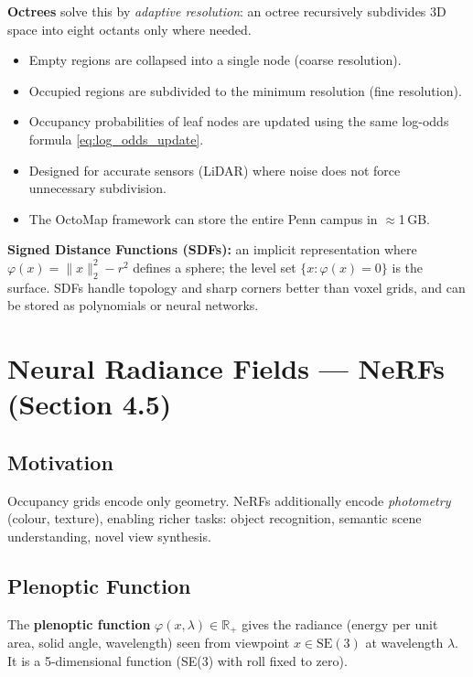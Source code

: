 \documentclass[12pt, a4paper]{article}
\begin{document}
\textbf{Octrees} solve this by \emph{adaptive resolution}: an octree
recursively subdivides 3D space into eight octants only where needed.
\begin{itemize}
  \item Empty regions are collapsed into a single node (coarse
    resolution).
  \item Occupied regions are subdivided to the minimum resolution
    (fine resolution).
  \item Occupancy probabilities of leaf nodes are updated using the
    same log-odds formula \eqref{eq:log_odds_update}.
  \item Designed for accurate sensors (LiDAR) where noise does not
    force unnecessary subdivision.
  \item The OctoMap framework can store the entire Penn campus in
    $\approx$1\,GB.
\end{itemize}

\textbf{Signed Distance Functions (SDFs):} an implicit representation
where $\varphi(x)=\|x\|_2^2-r^2$ defines a sphere; the level set
$\{x:\varphi(x)=0\}$ is the surface. SDFs handle topology and sharp
corners better than voxel grids, and can be stored as polynomials or
neural networks.

\section{Neural Radiance Fields --- NeRFs (Section 4.5)}

\subsection{Motivation}

Occupancy grids encode only geometry. NeRFs additionally encode
\emph{photometry} (colour, texture), enabling richer tasks: object
recognition, semantic scene understanding, novel view synthesis.

\subsection{Plenoptic Function}

The \textbf{plenoptic function} $\varphi(x,\lambda)\in\mathbb{R}_+$
gives the radiance (energy per unit area, solid angle, wavelength) seen
from viewpoint $x\in\mathrm{SE}(3)$ at wavelength $\lambda$. It is a
5-dimensional function (SE(3) with roll fixed to zero).
\end{document}
